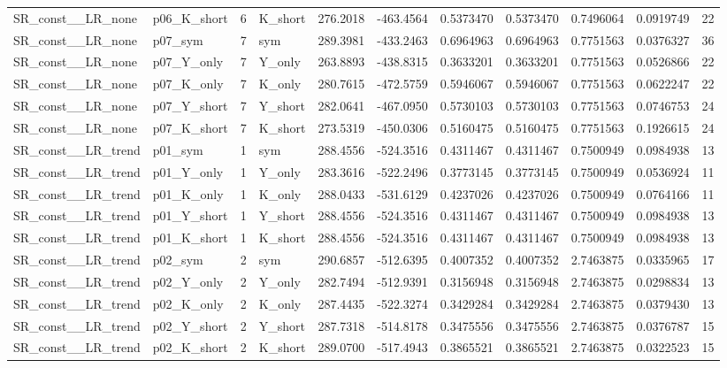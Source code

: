 \begin{table}[!h]
\begin{tabular}[t]{llrlrrrrrrr}
SR\_const\_\_LR\_none & p06\_K\_short & 6 & K\_short & 276.2018 & -463.4564 & 0.5373470 & 0.5373470 & 0.7496064 & 0.0919749 & 22\\
\addlinespace
SR\_const\_\_LR\_none & p07\_sym & 7 & sym & 289.3981 & -433.2463 & 0.6964963 & 0.6964963 & 0.7751563 & 0.0376327 & 36\\
SR\_const\_\_LR\_none & p07\_Y\_only & 7 & Y\_only & 263.8893 & -438.8315 & 0.3633201 & 0.3633201 & 0.7751563 & 0.0526866 & 22\\
SR\_const\_\_LR\_none & p07\_K\_only & 7 & K\_only & 280.7615 & -472.5759 & 0.5946067 & 0.5946067 & 0.7751563 & 0.0622247 & 22\\
SR\_const\_\_LR\_none & p07\_Y\_short & 7 & Y\_short & 282.0641 & -467.0950 & 0.5730103 & 0.5730103 & 0.7751563 & 0.0746753 & 24\\
SR\_const\_\_LR\_none & p07\_K\_short & 7 & K\_short & 273.5319 & -450.0306 & 0.5160475 & 0.5160475 & 0.7751563 & 0.1926615 & 24\\
\addlinespace
SR\_const\_\_LR\_trend & p01\_sym & 1 & sym & 288.4556 & -524.3516 & 0.4311467 & 0.4311467 & 0.7500949 & 0.0984938 & 13\\
SR\_const\_\_LR\_trend & p01\_Y\_only & 1 & Y\_only & 283.3616 & -522.2496 & 0.3773145 & 0.3773145 & 0.7500949 & 0.0536924 & 11\\
SR\_const\_\_LR\_trend & p01\_K\_only & 1 & K\_only & 288.0433 & -531.6129 & 0.4237026 & 0.4237026 & 0.7500949 & 0.0764166 & 11\\
SR\_const\_\_LR\_trend & p01\_Y\_short & 1 & Y\_short & 288.4556 & -524.3516 & 0.4311467 & 0.4311467 & 0.7500949 & 0.0984938 & 13\\
SR\_const\_\_LR\_trend & p01\_K\_short & 1 & K\_short & 288.4556 & -524.3516 & 0.4311467 & 0.4311467 & 0.7500949 & 0.0984938 & 13\\
\addlinespace
SR\_const\_\_LR\_trend & p02\_sym & 2 & sym & 290.6857 & -512.6395 & 0.4007352 & 0.4007352 & 2.7463875 & 0.0335965 & 17\\
SR\_const\_\_LR\_trend & p02\_Y\_only & 2 & Y\_only & 282.7494 & -512.9391 & 0.3156948 & 0.3156948 & 2.7463875 & 0.0298834 & 13\\
SR\_const\_\_LR\_trend & p02\_K\_only & 2 & K\_only & 287.4435 & -522.3274 & 0.3429284 & 0.3429284 & 2.7463875 & 0.0379430 & 13\\
SR\_const\_\_LR\_trend & p02\_Y\_short & 2 & Y\_short & 287.7318 & -514.8178 & 0.3475556 & 0.3475556 & 2.7463875 & 0.0376787 & 15\\
SR\_const\_\_LR\_trend & p02\_K\_short & 2 & K\_short & 289.0700 & -517.4943 & 0.3865521 & 0.3865521 & 2.7463875 & 0.0322523 & 15\\

\end{tabular}
\end{table}

